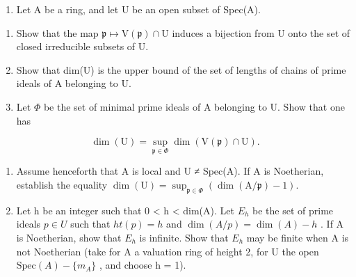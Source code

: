 
\begin{enumerate}
\def\labelenumi{\arabic{enumi})}
\tightlist
\item
  Let A be a ring, and let U be an open subset of Spec(A).
\end{enumerate}

\begin{enumerate}
\def\labelenumi{\alph{enumi})}
\item
  Show that the map \(\mathfrak{p} \mapsto \mathrm{V}(\mathfrak{p}) \cap \mathrm{U}\) induces a bijection from U onto the set of closed irreducible subsets of U.
\item
  Show that dim(U) is the upper bound of the set of lengths of chains of prime ideals of A belonging to U.
\item
  Let \(\Phi\) be the set of minimal prime ideals of A belonging to U. Show that one has
\end{enumerate}

\[
\dim (\mathrm{U}) = \sup _ {\mathfrak {p} \in \Phi} \dim (\mathrm{V} (\mathfrak {p}) \cap \mathrm{U}).
\]

\begin{enumerate}
\def\labelenumi{\alph{enumi})}
\setcounter{enumi}{3}
\item
  Assume henceforth that A is local and U ≠ Spec(A). If A is Noetherian, establish the equality \(\dim(\mathrm{U}) = \sup_{\mathfrak{p}\in\Phi}(\dim(\mathrm{A}/\mathfrak{p}) - 1)\).
\item
  Let h be an integer such that 0 \textless{} h \textless{} dim(A). Let \(E_{h}\) be the set of prime ideals \(p \in U\) such that \(ht(p) = h\) and \(\dim(A/p) = \dim(A) - h\) . If A is Noetherian, show that \(E_{h}\) is infinite. Show that \(E_{h}\) may be finite when A is not Noetherian (take for A a valuation ring of height 2, for U the open \(\text{Spec}(A) - \{m_{A}\}\) , and choose h = 1).
\end{enumerate}

